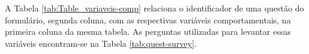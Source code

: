 A Tabela \ref{tab:Table_variaveis-comp} relaciona o identificador de uma questão do formulário, segunda coluna, com as respectivas variáveis comportamentais, na primeira coluna da mesma tabela. As perguntas utilizadas para levantar essas variáveis encontram-se na Tabela \ref{tab:quest-survey}.  

